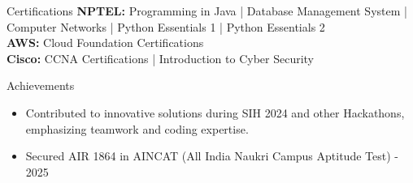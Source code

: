 \documentclass{resume} %
\begin{document}
\begin{rSection}{Certifications}
\vspace{-0.5em}
\textbf{NPTEL:} Programming in Java | Database Management System | Computer Networks | Python Essentials 1 | Python Essentials 2 \\
\textbf{AWS:} Cloud Foundation Certifications \\
\textbf{Cisco:} CCNA Certifications | Introduction to Cyber Security
\end{rSection}

\begin{rSection}{Achievements}
\vspace{-0.5em}
\begin{itemize}
    \itemsep -4pt {}
    \item Contributed to innovative solutions during SIH 2024 and other Hackathons, emphasizing teamwork and coding expertise.
    \item Secured AIR 1864 in AINCAT (All India Naukri Campus Aptitude Test) - 2025
\end{itemize}
\end{rSection}
\end{document}
